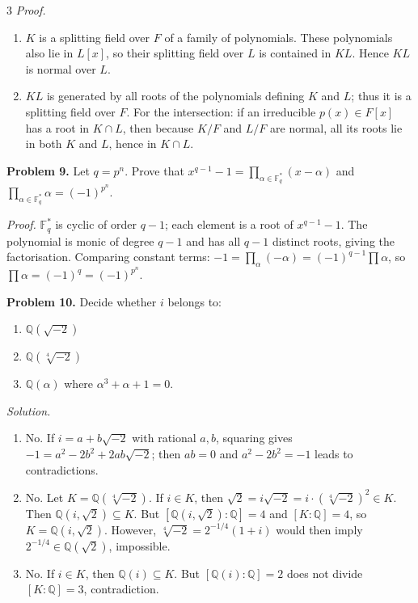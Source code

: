 \documentclass[10pt,landscape]{article}
\begin{document}
\begin{multicols}{3}
\textit{Proof.}
\begin{enumerate}
\item \(K\) is a splitting field over \(F\) of a family of polynomials. These polynomials also lie in \(L[x]\), so their splitting field over \(L\) is contained in \(KL\). Hence \(KL\) is normal over \(L\).
\item \(KL\) is generated by all roots of the polynomials defining \(K\) and \(L\); thus it is a splitting field over \(F\). For the intersection: if an irreducible \(p(x)\in F[x]\) has a root in \(K\cap L\), then because \(K/F\) and \(L/F\) are normal, all its roots lie in both \(K\) and \(L\), hence in \(K\cap L\). 
\end{enumerate}

\noindent\textbf{Problem 9.} Let \(q=p^n\). Prove that \(x^{q-1}-1=\prod_{\alpha\in\mathbb{F}_q^*}(x-\alpha)\) and \(\prod_{\alpha\in\mathbb{F}_q^*}\alpha = (-1)^{p^n}\).

\textit{Proof.} \(\mathbb{F}_q^*\) is cyclic of order \(q-1\); each element is a root of \(x^{q-1}-1\). The polynomial is monic of degree \(q-1\) and has all \(q-1\) distinct roots, giving the factorisation. Comparing constant terms: \(-1 = \prod_{\alpha}(-\alpha)=(-1)^{q-1}\prod\alpha\), so \(\prod\alpha = (-1)^q = (-1)^{p^n}\). 

\noindent\textbf{Problem 10.} Decide whether \(i\) belongs to:
\begin{enumerate}
\item \(\mathbb{Q}(\sqrt{-2})\)
\item \(\mathbb{Q}(\sqrt[4]{-2})\)
\item \(\mathbb{Q}(\alpha)\) where \(\alpha^3+\alpha+1=0\).
\end{enumerate}

\textit{Solution.}
\begin{enumerate}
\item No. If \(i=a+b\sqrt{-2}\) with rational \(a,b\), squaring gives \(-1=a^2-2b^2+2ab\sqrt{-2}\); then \(ab=0\) and \(a^2-2b^2=-1\) leads to contradictions.
\item No. Let \(K=\mathbb{Q}(\sqrt[4]{-2})\). If \(i\in K\), then \(\sqrt2 = i\sqrt{-2} = i\cdot(\sqrt[4]{-2})^2 \in K\). Then \(\mathbb{Q}(i,\sqrt2)\subseteq K\). But \([\mathbb{Q}(i,\sqrt2):\mathbb{Q}]=4\) and \([K:\mathbb{Q}]=4\), so \(K=\mathbb{Q}(i,\sqrt2)\). However, \(\sqrt[4]{-2}=2^{-1/4}(1+i)\) would then imply \(2^{-1/4}\in\mathbb{Q}(\sqrt2)\), impossible.
\item No. If \(i\in K\), then \(\mathbb{Q}(i)\subseteq K\). But \([\mathbb{Q}(i):\mathbb{Q}]=2\) does not divide \([K:\mathbb{Q}]=3\), contradiction. 
\end{enumerate}


\end{multicols}
\end{document}
